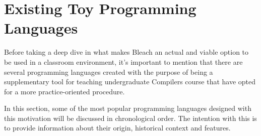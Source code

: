 \section{Existing Toy Programming Languages}

Before taking a deep dive in what makes Bleach an actual and viable option to be used in a classroom environment, it's important to mention that there are several programming languages created with the purpose of being a supplementary tool for teaching undergraduate Compilers course that have opted for a more practice-oriented procedure.

In this section, some of the most popular programming languages designed with this motivation will be discussed in chronological order. The intention with this is to provide information about their origin, historical context and features.

